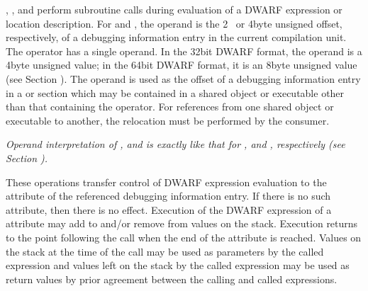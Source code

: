 \begin{enumerate}[1. ]
, 
, 
and  perform
subroutine calls during evaluation of a DWARF expression or
location description. 
For  and 
, 
the
operand is the 2\dash~ or 4\dash byte 
unsigned offset, respectively,
of a debugging information entry in the current compilation
unit. The  operator has a single operand. In the
32\dash bit DWARF format, the operand is a 4\dash byte unsigned value;
in the 64\dash bit DWARF format, it is an 8\dash byte unsigned value
(see Section ). 
The operand is used as the offset of a
debugging information entry in a 
or
section which may be contained in a shared object or executable
other than that containing the operator. For references from
one shared object or executable to another, the relocation
must be performed by the consumer.  

\textit{Operand interpretation of
,  and  is exactly like
that for ,  and ,
respectively  
(see Section  ).  
}

These operations transfer
control of DWARF expression evaluation to 
the 
attribute of the referenced debugging information entry. If
there is no such attribute, then there is no effect. Execution
of the DWARF expression of 
a 
 attribute may add
to and/or remove from values on the stack. Execution returns
to the point following the call when the end of the attribute
is reached. Values on the stack at the time of the call may be
used as parameters by the called expression and values left on
the stack by the called expression may be used as return values
by prior agreement between the calling and called expressions.
\end{enumerate}

